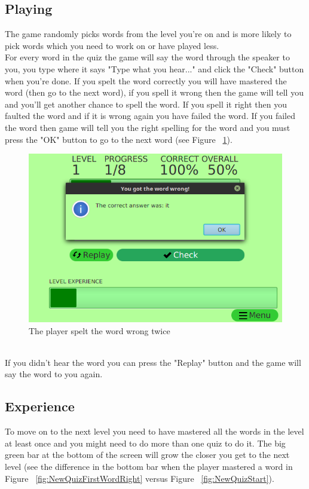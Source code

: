 \documentclass[12pt,a4paper,titlepage,onecolumn]{article}
\begin{document}
	\subsection{Playing}
	The game randomly picks words from the level you're on and is more likely to pick words which you need to work on or have played less.\\
	For every word in the quiz the game will say the word through the speaker to you, you type where it says "Type what you hear..." and click the "Check" button when you're done. If you spelt the word correctly you will have mastered the word (then go to the next word), if you spell it wrong then the game will tell you and you'll get another chance to spell the word. If you spell it right then you faulted the word and if it is wrong again you have failed the word. If you failed the word then game will tell you the right spelling for the word and you must press the "OK" button to go to the next word (see Figure ~\ref{fig:NewQuizSecondWordWrong}).
	\begin{figure}[h]
	\centering
	\includegraphics[width=1\linewidth]{Figures/NewQuiz/NewQuizSecondWordWrong}
	\caption[Failed Word]{The player spelt the word wrong twice}
	\label{fig:NewQuizSecondWordWrong}
	\end{figure}\\
	If you didn't hear the word you can press the "Replay" button and the game will say the word to you again.
	\subsection{Experience}
	To move on to the next level you need to have mastered all the words in the level at least once and you might need to do more than one quiz to do it. The big green bar at the bottom of the screen will grow the closer you get to the next level (see the difference in the bottom bar when the player mastered a word in Figure ~\ref{fig:NewQuizFirstWordRight} versus Figure ~\ref{fig:NewQuizStart}).
\end{document}
